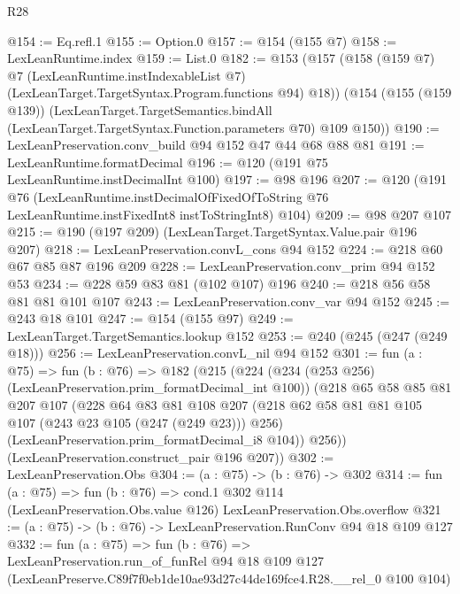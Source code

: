 \begin{lexlean}{R28}
\begin{coremodule}
@154 := Eq.refl.{1}
@155 := Option.{0}
@157 := @154 (@155 @7)
@158 := LexLeanRuntime.index
@159 := List.{0}
@182 := @153
    (@157
      (@158
        (@159 @7)
        @7
        (LexLeanRuntime.instIndexableList @7)
        (LexLeanTarget.TargetSyntax.Program.functions @94)
        @18))
    (@154
      (@155 (@159 @139))
      (LexLeanTarget.TargetSemantics.bindAll
        (LexLeanTarget.TargetSyntax.Function.parameters @70)
        @109
        @150))
@190 := LexLeanPreservation.conv_build @94 @152 @47 @44 @68 @88 @81
@191 := LexLeanRuntime.formatDecimal
@196 := @120 (@191 @75 LexLeanRuntime.instDecimalInt @100)
@197 := @98 @196
@207 := @120
    (@191
      @76
      (LexLeanRuntime.instDecimalOfFixedOfToString
        @76
        LexLeanRuntime.instFixedInt8
        instToStringInt8)
      @104)
@209 := @98 @207 @107
@215 := @190 (@197 @209) (LexLeanTarget.TargetSyntax.Value.pair @196 @207)
@218 := LexLeanPreservation.convL_cons @94 @152
@224 := @218 @60 @67 @85 @87 @196 @209
@228 := LexLeanPreservation.conv_prim @94 @152 @53
@234 := @228 @59 @83 @81 (@102 @107) @196
@240 := @218 @56 @58 @81 @81 @101 @107
@243 := LexLeanPreservation.conv_var @94 @152
@245 := @243 @18 @101
@247 := @154 (@155 @97)
@249 := LexLeanTarget.TargetSemantics.lookup @152
@253 := @240 (@245 (@247 (@249 @18)))
@256 := LexLeanPreservation.convL_nil @94 @152
@301 := fun (a : @75) =>
  fun (b : @76) =>
  @182
    (@215
      (@224
        (@234 (@253 @256) (LexLeanPreservation.prim_formatDecimal_int @100))
        (@218
          @65
          @58
          @85
          @81
          @207
          @107
          (@228
            @64
            @83
            @81
            @108
            @207
            (@218 @62 @58 @81 @81 @105 @107 (@243 @23 @105 (@247 (@249 @23))) @256)
            (LexLeanPreservation.prim_formatDecimal_i8 @104))
          @256))
      (LexLeanPreservation.construct_pair @196 @207))
@302 := LexLeanPreservation.Obs
@304 := (a : @75) -> (b : @76) -> @302
@314 := fun (a : @75) =>
  fun (b : @76) =>
  cond.{1} @302 @114 (LexLeanPreservation.Obs.value @126) LexLeanPreservation.Obs.overflow
@321 := (a : @75) -> (b : @76) -> LexLeanPreservation.RunConv @94 @18 @109 @127
@332 := fun (a : @75) =>
  fun (b : @76) =>
  LexLeanPreservation.run_of_funRel
    @94
    @18
    @109
    @127
    (LexLeanPreserve.C89f7f0eb1de10ae93d27c44de169fce4.R28.__rel_0 @100 @104)
\end{coremodule}
\end{lexlean}
